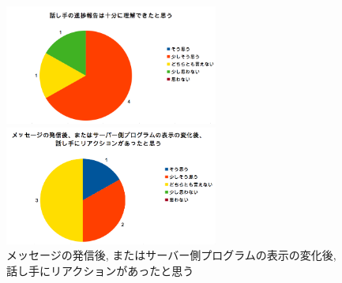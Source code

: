 \documentclass{funthesis}
\begin{document}
  \begin{figure}[H]
 \begin{minipage}{0.5\hsize}
  \begin{center}
  \includegraphics[width=70mm]{./img/question5.png}
  \end{center}
  \caption{話し手の進捗報告は十分に聞けた\newline と思う}
  \label{question5}
 \end{minipage}
 \begin{minipage}{0.5\hsize}
  \begin{center}
  \includegraphics[width=70mm]{./img/question6.png}
  \end{center}
  \caption{メッセージの発信後, またはサーバー側プログラムの表示の変化後, 話し手に\newline リアクションがあったと思う}
  \label{question6}
  \end{minipage}
  \end{figure}
  
\end{document}
